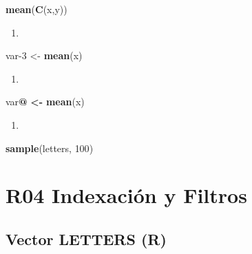 \documentclass[]{book}
\newenvironment{Shaded}{\begin{snugshade}}{\end{snugshade}}
\newcommand{\DecValTok}[1]{\textcolor[rgb]{0.00,0.00,0.81}{#1}}
\newcommand{\ErrorTok}[1]{\textcolor[rgb]{0.64,0.00,0.00}{\textbf{#1}}}
\newcommand{\KeywordTok}[1]{\textcolor[rgb]{0.13,0.29,0.53}{\textbf{#1}}}
\newcommand{\NormalTok}[1]{#1}
\newcommand{\OperatorTok}[1]{\textcolor[rgb]{0.81,0.36,0.00}{\textbf{#1}}}
\newcommand{\StringTok}[1]{\textcolor[rgb]{0.31,0.60,0.02}{#1}}
\begin{document}
\begin{Shaded}
\begin{Highlighting}[]
  \KeywordTok{mean}\NormalTok{(}\KeywordTok{C}\NormalTok{(x,y))}
\end{Highlighting}
\end{Shaded}

\begin{enumerate}
\def\labelenumi{\arabic{enumi}.}
\setcounter{enumi}{4}
\item
\end{enumerate}

\begin{Shaded}
\begin{Highlighting}[]
\NormalTok{  var}\DecValTok{-3}\NormalTok{ <-}\StringTok{ }\KeywordTok{mean}\NormalTok{(x)}
\end{Highlighting}
\end{Shaded}

\begin{enumerate}
\def\labelenumi{\arabic{enumi}.}
\setcounter{enumi}{5}
\item
\end{enumerate}

\begin{Shaded}
\begin{Highlighting}[]
\NormalTok{  var}\OperatorTok{@}\StringTok{ }\ErrorTok{<}\OperatorTok{-}\StringTok{ }\KeywordTok{mean}\NormalTok{(x)}
\end{Highlighting}
\end{Shaded}

\begin{enumerate}
\def\labelenumi{\arabic{enumi}.}
\setcounter{enumi}{6}
\item
\end{enumerate}

\begin{Shaded}
\begin{Highlighting}[]
  \KeywordTok{sample}\NormalTok{(letters, }\DecValTok{100}\NormalTok{)}
\end{Highlighting}
\end{Shaded}

\hypertarget{r04-indexaciuxf3n-y-filtros}{%
\chapter*{R04 Indexación y Filtros}\label{r04-indexaciuxf3n-y-filtros}}

\hypertarget{vector-letters-r}{%
\section{Vector LETTERS (R)}\label{vector-letters-r}}
\end{document}
